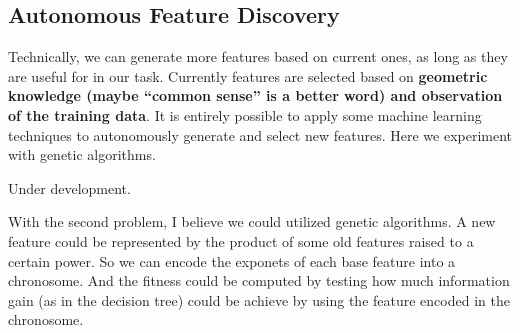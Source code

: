 \subsection{Autonomous Feature Discovery}

Technically, we can generate more features based on current ones, as long as they are useful for in our task. Currently features are selected based on \textbf{geometric knowledge (maybe ``common sense'' is a better word) and observation of the training data}. It is entirely possible to apply some machine learning techniques to autonomously generate and select new features. Here we experiment with genetic algorithms.

Under development.

With the second problem, I believe we could utilized genetic algorithms. A new feature could be represented by the product of some old features raised to a certain power. So we can encode the exponets of each base feature into a chronosome. And the fitness could be computed by testing how much information gain (as in the decision tree) could be achieve by using the feature encoded in the chronosome.
